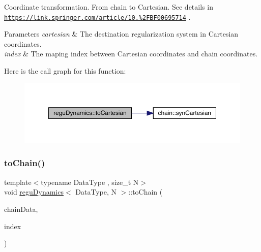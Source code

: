 Coordinate transformation. From chain to Cartesian. See details in \href{https://link.springer.com/article/10.1007%2FBF00695714}{\tt https\+://link.\+springer.\+com/article/10.\%2\+F\+B\+F00695714} . 
\begin{DoxyParams}{Parameters}
{\em cartesian} & The destination regularization system in Cartesian coordinates. \\
\hline
{\em index} & The maping index between Cartesian coordinates and chain coordinates. \\
\hline
\end{DoxyParams}
Here is the call graph for this function\+:\nopagebreak
\begin{figure}[H]
\begin{center}
\leavevmode
\includegraphics[width=350pt]{classregu_dynamics_a3dd8d377588308a02396ca6d06945859_cgraph}
\end{center}
\end{figure}
\mbox{\label{classregu_dynamics_aae4e77bbbb00f0bdddb396047f1c0fc2}} 
\subsubsection{\texorpdfstring{to\+Chain()}{toChain()}}
{\footnotesize\ttfamily template$<$typename Data\+Type , size\+\_\+t N$>$ \\
void \mbox{\hyperlink{classregu_dynamics}{regu\+Dynamics}}$<$ Data\+Type, N $>$\+::to\+Chain (\begin{DoxyParamCaption}\item[{\mbox{\hyperlink{classregu_dynamics}{regu\+Dynamics}}$<$ Data\+Type, N $>$ \&}]{chain\+Data,  }\item[{\mbox{\hyperlink{classregu_dynamics_a2c9fa7372e4a11be9d85728b4a0e455f}{Index\+Array}} \&}]{index }\end{DoxyParamCaption})\hspace{0.3cm}{\ttfamily [inline]}}



